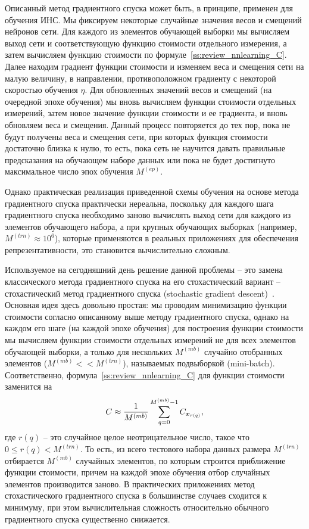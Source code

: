 \documentclass[a4paper,12pt,russian]{article} %
\begin{document}
Описанный метод градиентного спуска может быть, в принципе, применен для обучения ИНС.
Мы фиксируем некоторые случайные значения весов и смещений нейронов сети.
Для каждого из элементов обучающей выборки мы вычисляем выход сети и соответствующую функцию стоимости отдельного измерения, а затем вычисляем функцию стоимости по формуле~\eqref{ss:review_nnlearning_C}.
Далее находим градиент функции стоимости и изменяем веса и смещения сети на малую величину, в направлении, противоположном градиенту с некоторой скоростью обучения $\eta$.
Для обновленных значений весов и смещений (на очередной эпохе обучения) мы вновь вычисляем функции стоимости отдельных измерений, затем новое значение функции стоимости и ее градиента, и вновь обновляем веса и смещения.
Данный процесс повторяется до тех пор, пока не будут получены веса и смещения сети, при которых функция стоимости достаточно близка к нулю, то есть, пока сеть не научится давать правильные предсказания на обучающем наборе данных или пока не будет достигнуто максимальное число эпох обучения $M^{(ep)}$.

Однако практическая реализация приведенной схемы обучения на основе метода градиентного спуска практически нереальна, поскольку для каждого шага градиентного спуска необходимо заново вычислять выход сети для каждого из элементов обучающего набора, а при крупных обучающих выборках (например, $M^{(trn)} \approx 10^6$), которые применяются в реальных приложениях для обеспечения репрезентативности,  это становится вычислительно сложным.

Используемое на сегодняшний день решение данной проблемы -- это замена классического метода градиентного спуска на его стохастический вариант -- стохастический метод градиентного спуска (stochastic gradient descent)~\cite{bottou2010large}.
Основная идея здесь довольно простая: мы проводим минимизацию функции стоимости согласно описанному выше методу градиентного спуска, однако на каждом его шаге (на каждой эпохе обучения) для построения функции стоимости мы вычисляем функции стоимости отдельных измерений не для всех элементов обучающей выборки, а только для нескольких $M^{(mb)}$ случайно отобранных элементов ($M^{(mb)} << M^{(trn)}$), называемых подвыборкой (mini-batch).
Соответственно, формула~\eqref{ss:review_nnlearning_C} для функции стоимости заменится на
\begin{equation} \label{ss:review_nnlearning_C_stochastic}
	C \approx \frac{1}{M^{(mb)}} \sum_{q=0}^{M^{(mb)}-1} C_{\bm{x}_{r(q)}},
\end{equation}
где $r(q)$ -- это случайное целое неотрицательное число, такое что  $0 \leq r(q) < M^{(trn)}$.
То есть, из всего тестового набора данных размера $M^{(trn)}$ отбирается $M^{(mb)}$ случайных элементов, по которым строится приближение функции стоимости, причем на каждой эпохе обучения отбор случайных элементов производится заново.
В практических приложениях метод стохастического градиентного спуска в большинстве случаев сходится к минимуму, при этом вычислительная сложность относительно обычного градиентного спуска существенно снижается.
\end{document}
